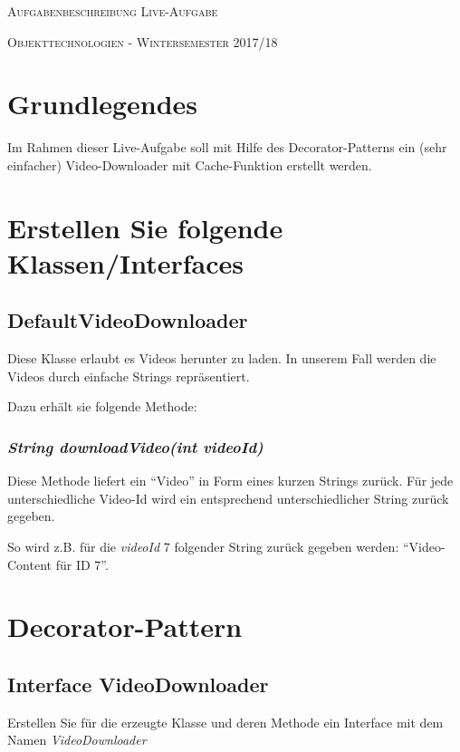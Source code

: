 \documentclass[oneside,a4paper]{scrartcl}
\author{Johannes Schneider}
\begin{document}
\centerline{\textsc{\LARGE Aufgabenbeschreibung Live-Aufgabe}}

\vspace{.5pc}
\centerline{\textsc{\large Objekttechnologien - Wintersemester 2017/18}}
\vspace{2pc}



\section{Grundlegendes}

Im Rahmen dieser Live-Aufgabe soll mit Hilfe des Decorator-Patterns ein (sehr einfacher) Video-Downloader mit Cache-Funktion erstellt werden.


\section{Erstellen Sie folgende Klassen/Interfaces}
\subsection{DefaultVideoDownloader}

Diese Klasse erlaubt es Videos herunter zu laden. In unserem Fall werden die Videos
durch einfache Strings repräsentiert.

Dazu erhält sie folgende Methode:

\subsubsection{\emph{String downloadVideo(int videoId)}}

Diese Methode liefert ein \enquote{Video} in Form eines kurzen Strings zurück. Für jede
unterschiedliche Video-Id wird ein entsprechend unterschiedlicher String zurück
gegeben.

So wird z.B. für die \emph{videoId} 7 folgender String zurück gegeben werden: \enquote{Video-Content für ID 7}.


\section{Decorator-Pattern}

\subsection{Interface VideoDownloader}
Erstellen Sie für die erzeugte Klasse und deren Methode ein Interface mit dem Namen \emph{VideoDownloader}
\end{document}
